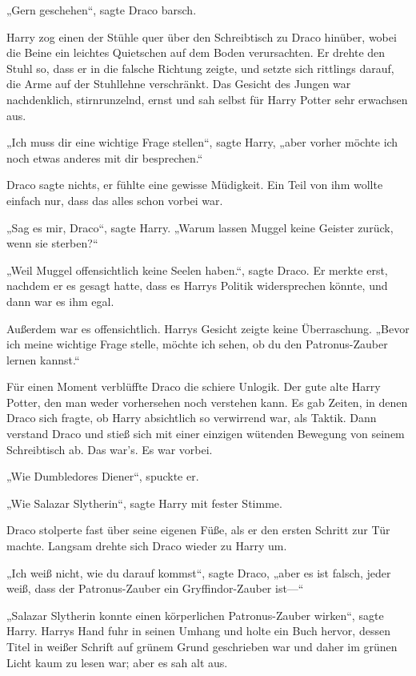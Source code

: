 {„Gern geschehen“, sagte Draco barsch.

Harry zog einen der Stühle quer über den Schreibtisch zu Draco hinüber, wobei die Beine ein leichtes Quietschen auf dem Boden verursachten. Er drehte den Stuhl so, dass er in die falsche Richtung zeigte, und setzte sich rittlings darauf, die Arme auf der Stuhllehne verschränkt. Das Gesicht des Jungen war nachdenklich, stirnrunzelnd, ernst und sah selbst für Harry Potter sehr erwachsen aus.

„Ich muss dir eine wichtige Frage stellen“, sagte Harry, „aber vorher möchte ich noch etwas anderes mit dir besprechen.“

Draco sagte nichts, er fühlte eine gewisse Müdigkeit. Ein Teil von ihm wollte einfach nur, dass das alles schon vorbei war.

„Sag es mir, Draco“, sagte Harry. „Warum lassen Muggel keine Geister zurück, wenn sie sterben?“

„Weil Muggel offensichtlich keine Seelen haben.“, sagte Draco. Er merkte erst, nachdem er es gesagt hatte, dass es Harrys Politik widersprechen könnte, und dann war es ihm egal.

Außerdem war es offensichtlich. Harrys Gesicht zeigte keine Überraschung. „Bevor ich meine wichtige Frage stelle, möchte ich sehen, ob du den Patronus-Zauber lernen kannst.“

Für einen Moment verblüffte Draco die schiere Unlogik. Der gute alte Harry Potter, den man weder vorhersehen noch verstehen kann. Es gab Zeiten, in denen Draco sich fragte, ob Harry absichtlich so verwirrend war, als Taktik. Dann verstand Draco und stieß sich mit einer einzigen wütenden Bewegung von seinem Schreibtisch ab. Das war's. Es war vorbei.

„Wie Dumbledores Diener“, spuckte er.

„Wie Salazar Slytherin“, sagte Harry mit fester Stimme.

Draco stolperte fast über seine eigenen Füße, als er den ersten Schritt zur Tür machte. Langsam drehte sich Draco wieder zu Harry um.

„Ich weiß nicht, wie du darauf kommst“, sagte Draco, „aber es ist falsch, jeder weiß, dass der Patronus-Zauber ein Gryffindor-Zauber ist—“

„Salazar Slytherin konnte einen körperlichen Patronus-Zauber wirken“, sagte Harry. Harrys Hand fuhr in seinen Umhang und holte ein Buch hervor, dessen Titel in weißer Schrift auf grünem Grund geschrieben war und daher im grünen Licht kaum zu lesen war; aber es sah alt aus.

}
